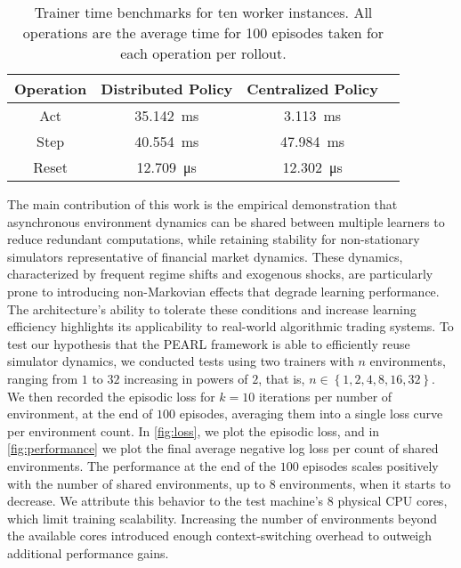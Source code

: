 \begin{table}[h!]
    \centering
    \begin{tabular}{|c|c|c|c|}
        \hline
        \textbf{Operation} & \textbf{Distributed Policy} & \textbf{Centralized Policy} \\
        \hline

        Act                & \SI{35.142}{\milli\second}  & \SI{3.113}{\milli\second}   \\
        Step               & \SI{40.554}{\milli\second}  & \SI{47.984}{\milli\second}  \\
        Reset              & \SI{12.709}{\micro\second}  & \SI{12.302}{\micro\second}  \\
        \hline
    \end{tabular}
    \caption{Trainer time benchmarks for ten worker instances. All operations are the average time for 100 episodes taken for each operation per rollout.}
    \label{tab:benchmarks}
\end{table}

The main contribution of this work is the empirical demonstration that asynchronous environment dynamics
can be shared between multiple learners to reduce redundant computations, while retaining stability for non-stationary simulators representative of financial market dynamics.
These dynamics, characterized by frequent regime shifts and exogenous shocks, are particularly prone to introducing non-Markovian effects that degrade learning performance.
The architecture’s ability to tolerate these conditions and increase learning efficiency highlights its applicability to real-world algorithmic trading systems.
To test our hypothesis that the PEARL framework is able to efficiently reuse simulator dynamics, we conducted tests using two trainers with $n$ environments,
ranging from $1$ to $32$ increasing in powers of $2$, that is, $n \in \left\{1, 2, 4, 8, 16, 32\right\}$.
We then recorded the episodic loss for $k = 10$ iterations per number of environment, at the end of $100$ episodes, averaging them into a single loss curve per environment count.
In \cref{fig:loss}, we plot the episodic loss, and in \cref{fig:performance} we plot the final average negative log loss per count of shared environments.
The performance at the end of the $100$ episodes scales positively with the number of shared environments, up to $8$ environments,
when it starts to decrease.
We attribute this behavior to the test machine's $8$ physical CPU cores, which limit training scalability.
Increasing the number of environments beyond the available cores introduced enough context-switching overhead to outweigh additional performance gains.

